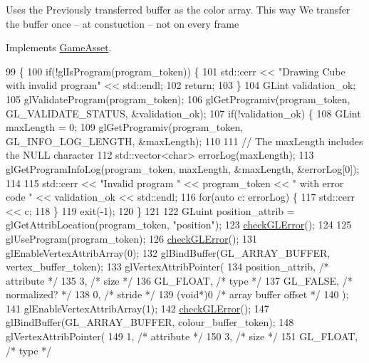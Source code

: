 Uses the Previously transferred buffer as the color array. This way We transfer the buffer once -- at constuction -- not on every frame

Implements \hyperlink{classGameAsset_a961aa51ca0a9961fc584c0b5d5431300}{Game\+Asset}.


\begin{DoxyCode}
99                                          \{
100   \textcolor{keywordflow}{if}(!glIsProgram(program\_token)) \{
101     std::cerr << \textcolor{stringliteral}{"Drawing Cube with invalid program"} << std::endl;
102     \textcolor{keywordflow}{return};
103   \}
104   GLint validation\_ok;
105   glValidateProgram(program\_token);
106   glGetProgramiv(program\_token, GL\_VALIDATE\_STATUS, &validation\_ok);
107   \textcolor{keywordflow}{if}(!validation\_ok) \{
108     GLint maxLength = 0;
109     glGetProgramiv(program\_token, GL\_INFO\_LOG\_LENGTH, &maxLength);
110 
111     \textcolor{comment}{// The maxLength includes the NULL character}
112     std::vector<char> errorLog(maxLength);
113     glGetProgramInfoLog(program\_token, maxLength, &maxLength, &errorLog[0]);
114 
115     std::cerr << \textcolor{stringliteral}{"Invalid program "} << program\_token << \textcolor{stringliteral}{" with error code "} << validation\_ok << std::endl;
116     \textcolor{keywordflow}{for}(\textcolor{keyword}{auto} c: errorLog) \{
117       std::cerr << c;
118     \}
119     exit(-1);
120   \}
121 
122   GLuint position\_attrib = glGetAttribLocation(program\_token, \textcolor{stringliteral}{"position"});
123   \hyperlink{CubeAsset_8cc_a75f201b0e53e68726854997957322b8d}{checkGLError}();
124 
125   glUseProgram(program\_token);
126   \hyperlink{CubeAsset_8cc_a75f201b0e53e68726854997957322b8d}{checkGLError}();
131   glEnableVertexAttribArray(0);
132   glBindBuffer(GL\_ARRAY\_BUFFER, vertex\_buffer\_token);
133   glVertexAttribPointer(
134     position\_attrib,        \textcolor{comment}{/* attribute */}
135     3,        \textcolor{comment}{/* size */}
136     GL\_FLOAT,   \textcolor{comment}{/* type */}
137     GL\_FALSE,   \textcolor{comment}{/* normalized? */}
138     0,        \textcolor{comment}{/* stride */}
139     (\textcolor{keywordtype}{void}*)0    \textcolor{comment}{/* array buffer offset */}
140   );
141   glEnableVertexAttribArray(1);
142   \hyperlink{CubeAsset_8cc_a75f201b0e53e68726854997957322b8d}{checkGLError}();
147   glBindBuffer(GL\_ARRAY\_BUFFER, colour\_buffer\_token);
148   glVertexAttribPointer(
149     1,        \textcolor{comment}{/* attribute */}
150     3,        \textcolor{comment}{/* size */}
151     GL\_FLOAT,   \textcolor{comment}{/* type */}

\end{DoxyCode}
